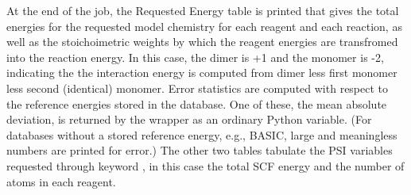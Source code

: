 \documentclass[letterpaper,10pt,english]{sphinxmanual}
\begin{document}
At the end of the job, the Requested Energy table is printed that gives the total
energies for the requested model chemistry for each reagent and each reaction, as
well as the stoichoimetric weights by which the reagent energies are transfromed
into the reaction energy. In this case, the dimer is +1 and the monomer is -2,
indicating the the interaction energy is computed from dimer less first monomer
less second (identical) monomer. Error statistics are computed with respect to the reference
energies stored in the database. One of these, the mean absolute deviation, is
returned by the wrapper as an ordinary Python variable. (For databases
without a stored reference energy, e.g., BASIC, large and meaningless numbers are
printed for error.) The other two tables tabulate the PSI variables requested
through keyword , in this case the total SCF energy and the number
of atoms in each reagent.
\end{document}
